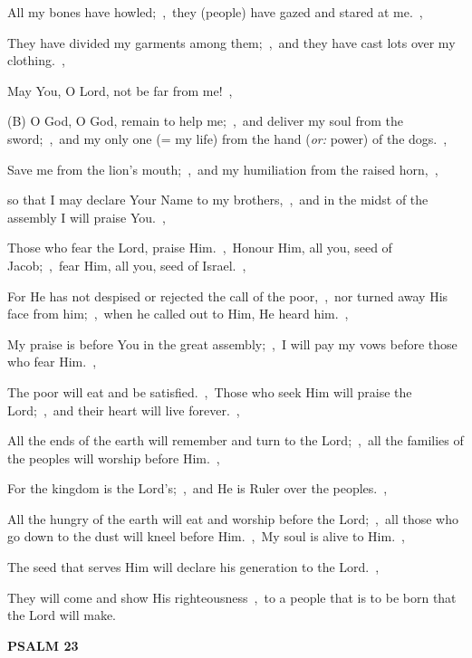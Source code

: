 \documentclass[12pt,twoside,a5paper]{article}
\newcommand{\psalm}[1]{\textbf{PSALM {#1}}\nopagebreak}
\newcommand{\translationoption}[1]{\emph{or:} #1}
\begin{document}
\begin{normalparskip}
  All my bones have howled;~\sep\ they (people) have gazed and stared at me.~\sep

  They have divided my garments among them;~\sep\ and they have cast lots over my clothing.~\sep

  May You, O Lord, not be far from me!~\sep

  (B) O God, O God, remain to help me;~\sep\ and deliver my soul from the sword;~\sep\ and my only one (= my life) from the hand (\translationoption{power}) of the dogs.~\sep

  Save me from the lion's mouth;~\sep\ and my humiliation from the raised horn,~\sep

  so that I may declare Your Name to my brothers,~\sep\ and in the midst of the assembly I will praise You.~\sep

  Those who fear the Lord, praise Him.~\sep\ Honour Him, all you, seed of Jacob;~\sep\ fear Him, all you, seed of Israel.~\sep

  For He has not despised or rejected the call of the poor,~\sep\ nor turned away His face from him;~\sep\ when he called out to Him, He heard him.~\sep

  My praise is before You in the great assembly;~\sep\ I will pay my vows before those who fear Him.~\sep

  The poor will eat and be satisfied.~\sep\ Those who seek Him will praise the Lord;~\sep\ and their heart will live forever.~\sep

  All the ends of the earth will remember and turn to the Lord;~\sep\ all the families of the peoples will worship before Him.~\sep

  For the kingdom is the Lord's;~\sep\ and He is Ruler over the peoples.~\sep

  All the hungry of the earth will eat and worship before the Lord;~\sep\ all those who go down to the dust will kneel before Him.~\sep\ My soul is alive to Him.~\sep

  The seed that serves Him will declare his generation to the Lord.~\sep

  They will come and show His righteousness~\sep\ to a people that is to be born that the Lord will make.
\end{normalparskip}

\psalm{23}
\end{document}
